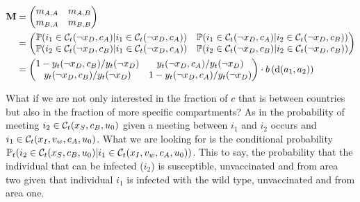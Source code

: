 \begin{align}
\label{eq:matrix_M}
\mathbf{M} &= \begin{pmatrix} 
m_{A,A} & m_{A,B} \\
m_{B,A} & m_{B,B} 
\end{pmatrix} \notag \\
&= \begin{pmatrix} 
\mathbb{P}(i_1 \in \mathcal{C}_t(\neg x_D, c_A) | i_1 \in \mathcal{C}_t(\neg x_D, c_A) ) & \mathbb{P}(i_1 \in \mathcal{C}_t(\neg x_D, c_A) | i_2 \in \mathcal{C}_t(\neg x_D, c_B) ) \\
\mathbb{P}(i_2 \in \mathcal{C}_t(\neg x_D, c_B) | i_1 \in \mathcal{C}_t(\neg x_D, c_A) ) & \mathbb{P}(i_2 \in \mathcal{C}_t(\neg x_D, c_B) | i_2 \in \mathcal{C}_t(\neg x_D, c_B) )
\end{pmatrix} \notag \\
&= \begin{pmatrix} 
1 - y_t(\neg x_D, c_B) / y_t(\neg x_D)   & y_t(\neg x_D, c_A) / y_t(\neg x_D)  \\
y_t(\neg x_D, c_B) / y_t(\neg x_D)  & 1 - y_t(\neg x_D, c_A) / y_t(\neg x_D)
\end{pmatrix} \cdot b\left(\text{d}(a_1, a_2) \right)
\end{align} 


What if we are not only interested in the fraction of $c$ that is between countries but also in the fraction of more specific compartments? As in the probability of meeting $i_2 \in \mathcal{C}_t(x_S, c_B, u_0)$ given a meeting between $i_1$ and $i_2$ occurs and $i_1 \in \mathcal{C}_t(x_I, v_w, c_A, u_0)$. What we are looking for is the conditional probability $\mathbb{P}_t(i_2 \in \mathcal{C}_t(x_S, c_B, u_0)|i_1 \in \mathcal{C}_t(x_I, v_w, c_A, u_0))$. This to say, the probability that the individual that can be infected ($i_2$) is susceptible, unvaccinated and from area two given that individual $i_1$ is infected with the wild type, unvaccinated and from area one. 

